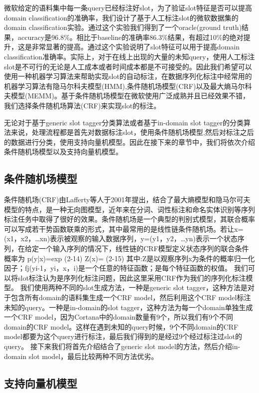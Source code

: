 \documentclass[master]{njuthesis}
\begin{document}
    微软给定的语料集中每一条query已经标注好slot，为了验证slot特征是否可以提高domain classification的准确率，我们设计了基于人工标注slot的微软数据集的domain classification实验。通过这个实验我们得到了一个oracle(ground truth)结果，accuracy是96.8\%。相比于baseline的准确率86.3\%结果，有超过10\%的绝对提升，这是非常显著的提高。通过这个实验说明了slot特征可以用于提高domain classification准确率。实际上，对于在线上出现的大量的未知query，使用人工标注slot是不可行的无论是人工成本或者时间成本都是不可接受的。因此我们希望可以使用一种机器学习算法来帮助实现slot的自动标注，在数据序列化标注中经常用的机器学习算法有隐马尔科夫模型(HMM),条件随机场模型(CRF)以及最大熵马尔科夫模型(MEMM)。基于条件随机场模型在微软使用广泛成熟并且已经效果不错，我们选择条件随机场算法(CRF)来实现slot的标注。
    
    无论对于基于generic slot tagger分类算法或者基于in-domain slot tagger的分类算法来说，处理流程都是首先对数据标注slot，使用条件随机场模型,然后对标注之后的数据进行分类，使用支持向量机模型。因此在接下来的章节中，我们将依次介绍条件随机场模型以及支持向量机模型。

\subsection{条件随机场模型}

条件随机场(CRF)由Lafferty等人于2001年提出，结合了最大熵模型和隐马尔可夫模型的特点，是一种无向图模型，近年来在分词、词性标注和命名实体识别等序列标注任务中取得了很好的效果。条件随机场是一个典型的判别式模型，其联合概率可以写成若干势函数联乘的形式，其中最常用的是线性链条件随机场。若让x=(x1，x2，…xn)表示被观察的输入数据序列，y=(y1，y2，…yn)表示一个状态序列，在给定一个输入序列的情况下，线性链的CRF模型定义状态序列的联合条件概率为
p(y|x)=exp{} (2-14)
Z(x)={} (2-15)
其中:Z是以观察序列x为条件的概率归一化因子；fj(yi-1，yi，x，i)是一个任意的特征函数；是每个特征函数的权值。
我们可以将slot标注认为是序列化标注问题，因此这里采用CRF作为我们的序列化标注模型。
我们使用两种不同的slot生成方法，一种是generic slot tagger，这种方法是对于包含所有domain的语料集生成一个CRF model，然后利用这个CRF model标注未知的query。一种是in-domain的slot tagger，这种方法为每一个domain单独生成一个CRF model，因为Cortana中的domain数量有9个，所以我们有9个不同domain的CRF model。这样在遇到未知的query时候，9个不同domain的CRF model都要为这个query进行标注，最后我们得到的是经过9个经过标注过slot的query。
接下来我们将首先介绍结合了generic slot model的方法，然后介绍in-domain slot model，最后比较两种不同方法优劣。
\subsection{支持向量机模型}
\end{document}
